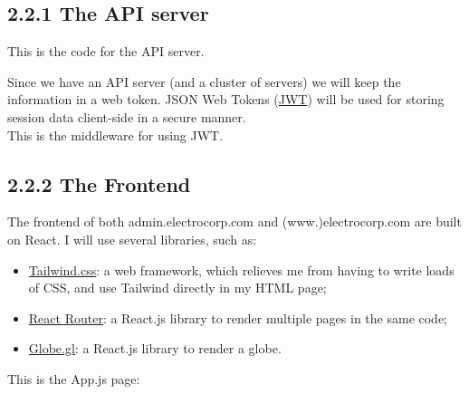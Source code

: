 \subsection*{2.2.1 \hspace{1cm} The API server}
This is the code for the API server.


Since we have an API server (and a cluster of servers) we will keep the information in a web token. JSON Web Tokens (\href{https://jwt.io/}{JWT}) will be used for storing session data client-side in a secure manner. \\
This is the middleware for using JWT. \\




\subsection*{2.2.2 \hspace{1cm} The Frontend}
The frontend of both admin.electrocorp.com and (www.)electrocorp.com are built on React.
I will use several libraries, such as:
\begin{itemize}
    \item \href{https://tailwindcss.com/}{Tailwind.css}: a web framework, which relieves me from having to write loads of CSS, and use Tailwind directly in my HTML page;
    \item \href{https://reactrouter.com/}{React Router}: a React.js library to render multiple pages in the same code;
    \item \href{https://globe.gl}{Globe.gl}: a React.js library to render a globe.
\end{itemize}

This is the App.js page:
